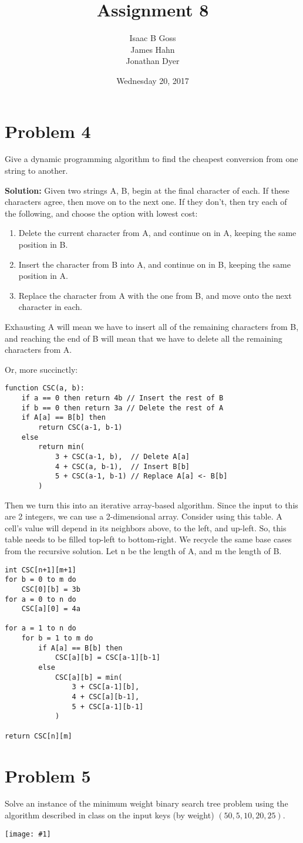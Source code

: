 \documentclass{article}
\author{Isaac B Goss\\ James Hahn\\ Jonathan Dyer}
\title{Assignment 8}
\date{Wednesday 20, 2017}
\providecommand{\prob}[1]{\section*{Problem #1}}
\providecommand{\soln}{\textbf{Solution: }}
\providecommand{\image}[1]{
    \begin{center}
        \texttt{[image: \#1]}
    \end{center}
}
\providecommand{\tightlist}{
    \setlength{\itemsep}{0pt}\setlength{\parskip}{0pt}
}
\begin{document}
\maketitle

    \prob{4}
    Give a dynamic programming algorithm to find the cheapest conversion from one string to another.
    
    \soln Given two strings A, B, begin at the final character of each.
    If these characters agree, then move on to the next one.
    If they don't, then try each of the following, and choose the option with lowest cost:
    \begin{enumerate}\tightlist
        \item Delete the current character from A, and continue on in A, keeping the same position in B.
        \item Insert the character from B into A, and continue on in B, keeping the same position in A.
        \item Replace the character from A with the one from B, and move onto the next character in each.
    \end{enumerate}

    Exhausting A will mean we have to insert all of the remaining characters from B, and reaching the end of B will mean that we have to delete all the remaining characters from A.
    
    Or, more succinctly:
    
    \begin{lstlisting}
function CSC(a, b):
    if a == 0 then return 4b // Insert the rest of B
    if b == 0 then return 3a // Delete the rest of A
    if A[a] == B[b] then
        return CSC(a-1, b-1)
    else
        return min(
            3 + CSC(a-1, b),  // Delete A[a]
            4 + CSC(a, b-1),  // Insert B[b]
            5 + CSC(a-1, b-1) // Replace A[a] <- B[b]
        )
    \end{lstlisting}

    Then we turn this into an iterative array-based algorithm.
    Since the input to this are 2 integers, we can use a 2-dimensional array.
    Consider using this table.
    A cell's value will depend in its neighbors above, to the left, and up-left.
    So, this table needs to be filled top-left to bottom-right.
    We recycle the same base cases from the recursive solution.
    Let n be the length of A, and m the length of B.
    
    \begin{lstlisting}
int CSC[n+1][m+1]
for b = 0 to m do
    CSC[0][b] = 3b
for a = 0 to n do
    CSC[a][0] = 4a

for a = 1 to n do
    for b = 1 to m do
        if A[a] == B[b] then
            CSC[a][b] = CSC[a-1][b-1]
        else
            CSC[a][b] = min(
                3 + CSC[a-1][b],
                4 + CSC[a][b-1],
                5 + CSC[a-1][b-1]
            )

return CSC[n][m]
    \end{lstlisting}
    
    \prob{5}
    Solve an instance of the minimum weight binary search tree problem using the algorithm described in class on the input keys (by weight) $(50, 5, 10, 20, 25)$.
    
    \image{jpic}
\end{document}
